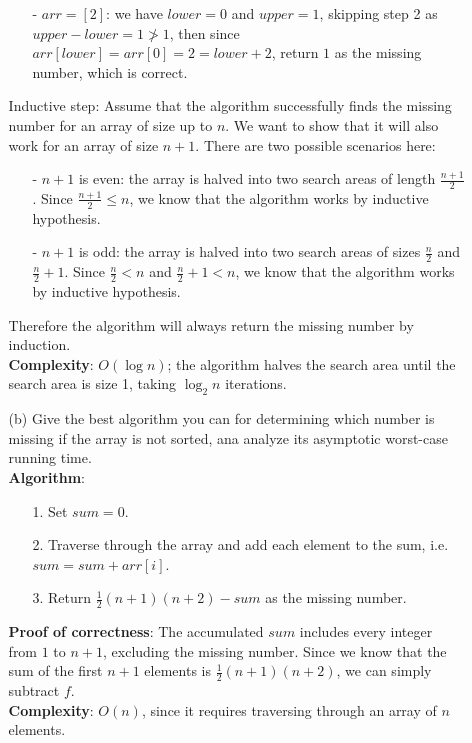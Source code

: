 \documentclass{article}
\begin{document}
\begin{itemize}
\begin{itemize}
\begin{itemize}
                        \item [-] $arr=[2]$: we have $lower=0$ and $upper=1$, skipping step 2 as $upper-lower=1\ngtr 1$, then since $arr[lower]=arr[0]=2=lower+2$, return $1$ as the missing number, which is correct.
                    \end{itemize}
                    Inductive step: Assume that the algorithm successfully finds the missing number for an array of size up to $n$. We want to show that it will also work for an array of size $n+1$. There are two possible scenarios here:
                    \begin{itemize}
                        \item [-] $n+1$ is even: the array is halved into two search areas of length $\frac{n+1}{2}$. Since $\frac{n+1}{2}\leq n$, we know that the algorithm works by inductive hypothesis.
                        \item [-] $n+1$ is odd: the array is halved into two search areas of sizes $\frac{n}{2}$ and $\frac{n}{2}+1$. Since $\frac{n}{2}<n$ and $\frac{n}{2}+1<n$, we know that the algorithm works by inductive hypothesis.
                    \end{itemize}
                    Therefore the algorithm will always return the missing number by induction.\\
                    \textbf{Complexity}: $O(\log n)$; the algorithm halves the search area until the search area is size 1, taking $\log_2 n$ iterations.
              \item [(b)] Give the best algorithm you can for determining which number is missing if the array is not sorted, ana analyze its asymptotic worst-case running time.\\
                    \textbf{Algorithm}:
                    \begin{itemize}
                        \item [1.] Set $sum=0$.
                        \item [2.] Traverse through the array and add each element to the sum, i.e. $sum=sum+arr[i]$.
                        \item [3.] Return $\frac{1}{2}(n+1)(n+2)-sum$ as the missing number.
                    \end{itemize}
                    \textbf{Proof of correctness}: The accumulated $sum$ includes every integer from $1$ to $n+1$, excluding the missing number. Since we know that the sum of the first $n+1$ elements is $\frac{1}{2}(n+1)(n+2)$, we can simply subtract $f$.\\
                    \textbf{Complexity}: $O(n)$, since it requires traversing through an array of $n$ elements.
          \end{itemize}
\end{itemize}
\end{document}
